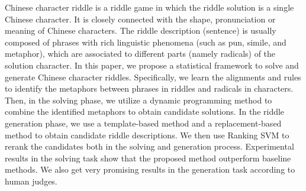 Chinese character riddle is a riddle game in which the riddle solution is a single Chinese character. It is closely connected with the shape, pronunciation or meaning of Chinese characters. The riddle description (sentence) is usually composed of phrases with rich linguistic phenomena (such as pun, simile, and metaphor), which are associated to different parts (namely radicals) of the solution character. In this paper, we propose a statistical framework to solve and generate Chinese character riddles. Specifically, we learn the alignments and rules to identify the metaphors between phrases in riddles and radicals in characters. Then, in the solving phase, we utilize a dynamic programming method to combine the identified metaphors to obtain candidate solutions. In the riddle generation phase, we use a template-based method and a replacement-based method to obtain candidate riddle descriptions. We then use Ranking SVM to rerank the candidates both in the solving and generation process. Experimental results in the solving task show that the proposed method outperform baseline methods. We also get very promising results in the generation task according to human judges.
